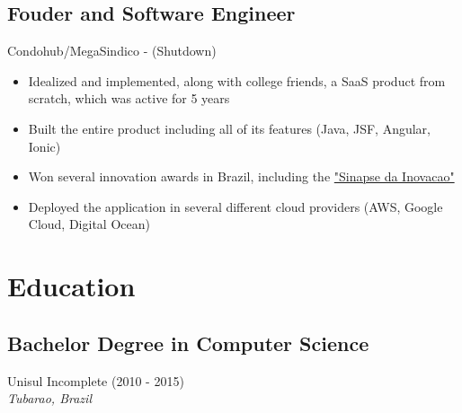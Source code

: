 \documentclass[11pt, a4paper]{article}
\begin{document}
\subsection*{Fouder and Software Engineer}
Condohub/MegaSindico - (Shutdown)
\begin{itemize}[noitemsep]
    \item Idealized and implemented, along with college friends, a SaaS product from scratch, which was active for 5 years
    \item Built the entire product including all of its features (Java, JSF, Angular, Ionic)
    \item Won several innovation awards in Brazil, including the \href{https://certi.org.br/pt/cases-sinapse-da-inovacao}{"Sinapse da Inovacao"}
    \item Deployed the application in several different cloud providers (AWS, Google Cloud, Digital Ocean)
\end{itemize}

\section*{Education}
\subsection*{Bachelor Degree in Computer Science}
Unisul \hfill Incomplete (2010 - 2015)\\
\textit{Tubarao, Brazil}
\end{document}
